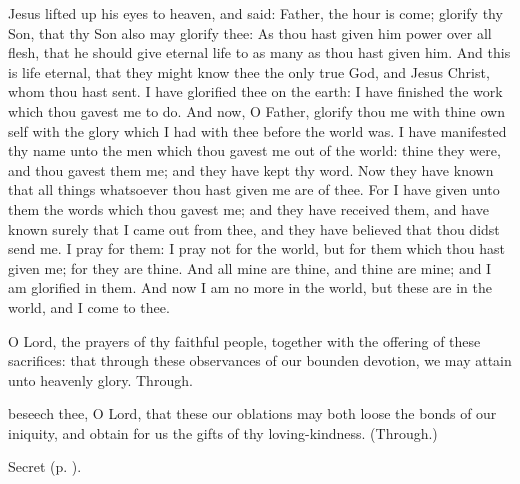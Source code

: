 \vspace{-0.25\baselineskip}


\vspace{-0.05\baselineskip}

 Jesus lifted up his eyes to heaven, and said: Father, the hour is come; glorify thy Son, that thy Son also may glorify thee: As thou hast given him power over all flesh, that he should give eternal life to as many as thou hast given him. And this is life eternal, that they might know thee the only true God, and Jesus Christ, whom thou hast sent. I have glorified thee on the earth: I have finished the work which thou gavest me to do. And now, O Father, glorify thou me with thine own self with the glory which I had with thee before the world was. I have manifested thy name unto the men which thou gavest me out of the world: thine they were, and thou gavest them me; and they have kept thy word. Now they have known that all things whatsoever thou hast given me are of thee. For I have given unto them the words which thou gavest me; and they have received them, and have known surely that I came out from thee, and they have believed that thou didst send me. I pray for them: I pray not for the world, but for them which thou hast given me; for they are thine. And all mine are thine, and thine are mine; and I am glorified in them. And now I am no more in the world, but these are in the world, and I come to thee.


\secret
{} O Lord, the prayers of thy faithful people, together with the offering of these sacrifices: that through these observances of our bounden devotion, we may attain unto heavenly glory. Through.

 beseech thee, O Lord, that these our oblations may both loose the bonds of our iniquity, and obtain for us the gifts of thy loving-kindness. (Through.)

\begin{rubric}
	 Secret  (p. \pageref{SPMaryInEaster}).
\end{rubric}

